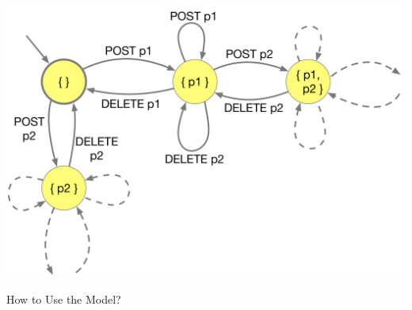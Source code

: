 \begin{frame}[fragile]{}

\includegraphics[width=\textwidth]{images/statemachine.pdf}

\end{frame}

\begin{frame}[fragile]{}

\begin{center}
{\Huge
How to Use the Model?
}
\end{center}

\end{frame}


